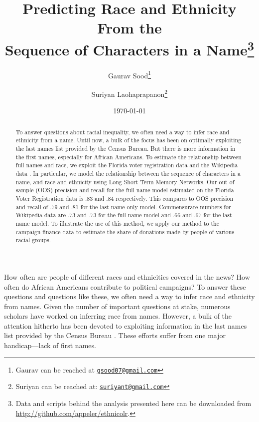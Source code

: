 \documentclass[12pt, letterpaper]{article}
\title{\Large{Predicting Race and Ethnicity From the\\Sequence of Characters in a Name}\footnote{Data and scripts behind the analysis presented here can be downloaded from \url{http://github.com/appeler/ethnicolr}.
}}
\author{Gaurav Sood\thanks{Gaurav can be reached at \href{mailto:gsood07@gmail.com}{\footnotesize{\texttt{gsood07@gmail.com}}}} \and Suriyan Laohaprapanon\thanks{Suriyan can be reached at: \href{mailto:suriyant@gmail.com}{\footnotesize{\texttt{suriyant@gmail.com}}}}\vspace{.5cm}}
\date{\vspace{.5cm}\normalsize{\today}}
\begin{document}
\maketitle

\begin{center}
\end{center}

\begin{comment}

setwd(paste0(githubdir, "ethnicolr_paper/"))
tools::texi2dvi("name_race.tex", pdf = TRUE, clean = TRUE) 
setwd(basedir)

\end{comment}


\begin{abstract}
To answer questions about racial inequality, we often need a way to infer race and ethnicity from a name. Until now, a bulk of the focus has been on optimally exploiting the last names list provided by the Census Bureau. But there is more information in the first names, especially for African Americans. To estimate the relationship between full names and race, we exploit the Florida voter registration data and the Wikipedia data \citep{ambekar2009name}. In particular, we model the relationship between the sequence of characters in a name, and race and ethnicity using Long Short Term Memory Networks. Our out of sample (OOS) precision and recall for the full name model estimated on the Florida Voter Registration data is .83 and .84 respectively. This compares to OOS precision and recall of .79 and .81 for the last name only model. Commensurate numbers for Wikipedia data are .73 and .73 for the full name model and .66 and .67 for the last name model. To illustrate the use of this method, we apply our method to the campaign finance data to estimate the share of donations made by people of various racial groups.
\end{abstract}
\clearpage
\doublespace

How often are people of different races and ethnicities covered in the news? How often do African Americans contribute to political campaigns? To answer these questions and questions like these, we often need a way to infer race and ethnicity from names. Given the number of important questions at stake, numerous scholars have worked on inferring race from names. However, a bulk of the attention hitherto has been devoted to exploiting information in the last names list provided by the Census Bureau \citep[see, e.g.,][]{fiscella2006use, imai2016improving}. These efforts suffer from one major handicap---lack of first names. 
\end{document}

